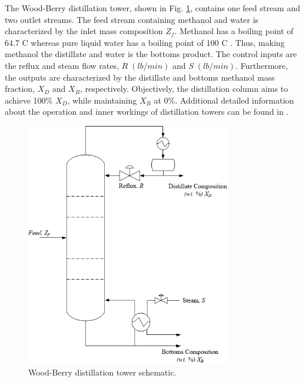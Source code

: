 The Wood-Berry distillation tower, shown in Fig. \ref{fig:woodberry}, contains one feed stream and two outlet streams. The feed stream containing methanol and water is characterized by the inlet mass composition $Z_f$. Methanol has a boiling point of 64.7 \textdegree C whereas pure liquid water has a boiling point of 100 \textdegree C \cite{sonntag_thermo}. Thus, making methanol the distillate and water is the bottoms product. The control inputs are the reflux and steam flow rates, $R \; (lb/min)$ and $S \; (lb/min)$. Furthermore, the outputs are characterized by the distillate and bottoms methanol mass fraction, $X_D$ and $X_B$, respectively. Objectively, the distillation column aims to achieve 100\% $X_D$, while maintaining $X_B$ at 0\%. Additional detailed information about the operation and inner workings of distillation towers can be found in \cite{henry_distillation}.  
\begin{figure}[H]
    \begin{center}
        \includegraphics[width=9cm]{images/ftc/woodberry.png}
        \caption{\label{fig:woodberry} Wood-Berry distillation tower schematic.}
    \end{center}
\end{figure}

